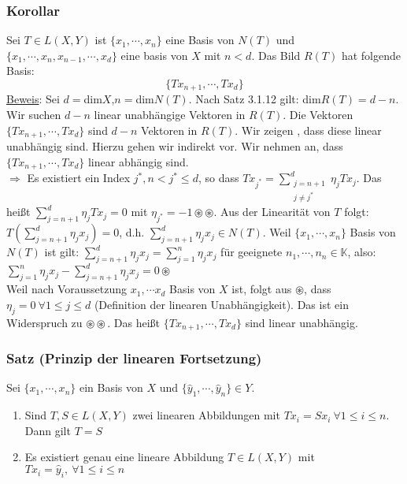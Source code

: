 \subsubsection{Korollar}
Sei $T\in L(X,Y)$ ist $\{x_1,\cdots ,x_n\}$ eine Basis von $N(T)$ und $\{x_1,\cdots ,x_n,x_{n-1},\cdots ,x_d\}$ eine basis von $X$ mit $n<d$.  Das Bild $R(T)$ hat folgende Basis:
\[\{Tx_{n+1},\cdots ,Tx_d\}\]
\underline{Beweis}:  Sei $d=$dim$X$,$n=$dim$N(T)$.  Nach Satz 3.1.12 gilt:
dim$R(T)=d-n$.  Wir suchen $d-n$ linear unabhängige Vektoren in $R(T)$.  Die Vektoren $\{Tx_{n+1},\cdots ,Tx_d\}$ sind $d-n$ Vektoren in $R(T)$.  Wir zeigen , dass diese linear unabhängig sind. Hierzu gehen wir indirekt vor.  Wir nehmen an, dass $\{Tx_{n+1},\cdots ,Tx_d\}$ linear abhängig sind.\\
$\Rightarrow$ Es existiert ein Index $j^*,n<j^*\leq d$, so dass $Tx_{j^*}=\sum_{\substack{j=n+1\\ j\not= j^*}}^d \eta _jTx_j$.  Das heißt $\sum_{j=n+1}^d \eta _jTx_j=0$ mit $\eta _{j^*}=-1 \circledast\circledast$.  Aus der Linearität von $T$ folgt: $T(\sum_{j=n+1}^d \eta _jx_j)=0$, d.h. $\sum_{j=n+1}^d \eta _jx_j \in N(T)$.  Weil $\{ x_1,\cdots ,x_n\}$ Basis von $N(T)$ ist gilt: $\sum_{j=n+1}^d\eta _jx_j=\sum_{j=1}^n\eta _jx_j$ für geeignete $n_1,\cdots ,n_n\in\mathbb{K}$, also: $\sum_{j=1}^n\eta _jx_j-\sum_{j=n+1}^d\eta _jx_j=0 \circledast$\\
Weil nach Voraussetzung $x_1,\cdots x_d$ Basis von $X$ ist, folgt aus $\circledast$, dass $\eta _j=0\ \forall 1\leq j\leq d$ (Definition der linearen Unabhängigkeit).  Das ist ein Widerspruch zu $\circledast\circledast$.  Das heißt $\{Tx_{n+1},\cdots ,Tx_d\}$ sind linear unabhängig.
\subsubsection{Satz (Prinzip der linearen Fortsetzung)}
Sei $\{x_1,\cdots ,x_n\}$ ein Basis von $X$ und $\{\hat{y}_1,\cdots ,\hat{y}_n\} \in Y$.
\renewcommand{\labelenumi}{(\alph{enumi})}
\begin{enumerate}
\item Sind $T,S\in L(X,Y)$ zwei linearen Abbildungen mit $Tx_i=Sx_i\ \forall 1\leq i\leq n$.  Dann gilt $T=S$
\item Es existiert genau eine lineare Abbildung $T\in L(X,Y)$ mit $Tx_i=\hat{y}_i,\ \forall 1\leq i\leq n$
\end{enumerate}

